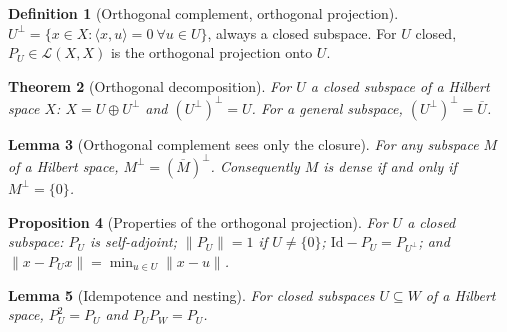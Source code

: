 \documentclass[a4paper]{report}
\theoremstyle{plain}
\newtheorem{theorem}{Theorem}[chapter]
\newtheorem{lemma}[theorem]{Lemma}
\newtheorem{proposition}[theorem]{Proposition}
\theoremstyle{definition}
\newtheorem{definition}[theorem]{Definition}
\theoremstyle{remark}
\begin{document}
\begin{definition}[Orthogonal complement, orthogonal projection]
  \label{def_orth_proj}
  $U^\perp = \{x \in X : \langle x,u\rangle = 0 \ \forall u \in U\}$, always a closed
  subspace.  For $U$ closed, $P_U \in \mathcal{L}(X,X)$ is the orthogonal projection
  onto $U$.
\end{definition}


\begin{theorem}[Orthogonal decomposition]
  \label{thm_orth_decomp}
  For $U$ a closed subspace of a Hilbert space $X$: $X = U \oplus U^\perp$ and
  $(U^\perp)^\perp = U$.  For a general subspace, $(U^\perp)^\perp = \overline{U}$.
\end{theorem}


\begin{lemma}[Orthogonal complement sees only the closure]
  \label{lem_orthogonal_closure}
  For any subspace $M$ of a Hilbert space, $M^\perp = (\overline{M})^\perp$.  Consequently
  $M$ is dense if and only if $M^\perp = \{0\}$.
\end{lemma}


\begin{proposition}[Properties of the orthogonal projection]
  \label{prop_proj_props}
  For $U$ a closed subspace: $P_U$ is self-adjoint; $\|P_U\| = 1$ if $U \ne \{0\}$;
  $\mathrm{Id}-P_U = P_{U^\perp}$; and $\|x-P_Ux\| = \min_{u \in U}\|x-u\|$.
\end{proposition}


\begin{lemma}[Idempotence and nesting]
  \label{lem_proj_nested_comp}
  For closed subspaces $U \subseteq W$ of a Hilbert space, $P_U^2 = P_U$ and
  $P_U P_W = P_U$.
\end{lemma}
\end{document}
